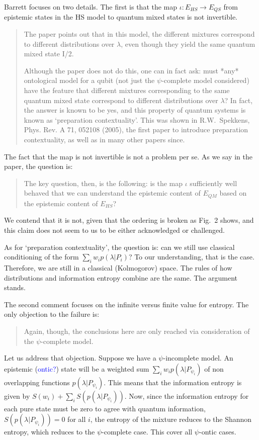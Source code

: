 \documentclass[11pt]{article}
\begin{document}
	Barrett focuses on two details. The first is that the map $\iota : E_{HS} \to E_{QS}$ from epistemic states in the HS model to quantum mixed states is not invertible. 
	\begin{quote}
The paper points out that in this model, the different mixtures correspond to different distributions over $\lambda$, even though they yield the same quantum mixed state I/2.

Although the paper does not do this, one can in fact ask: must *any* ontological model for a qubit (not just the $\psi$-complete model considered) have the feature that different mixtures corresponding to the same quantum mixed state correspond to different distributions over $\lambda$? In fact, the answer is known to be yes, and this property of quantum systems is known as `preparation contextuality’. This was shown in R.W.\ Spekkens, Phys. Rev. A 71, 052108 (2005), the first paper to introduce preparation contextuality, as well as in many other papers since.
	\end{quote}

	The fact that the map is not invertible is not a problem per se. As we say in the paper, the question is:
	\begin{quote}
The key question, then, is the following: is the
map $\iota$ sufficiently well behaved that we can understand
the epistemic content of $E_{QM}$ based on the epistemic
content of $E_{HS}$?
	\end{quote}
We contend that it is not, given that the ordering is broken as Fig.~2 shows, and this claim does not seem to us to be either acknowledged or challenged.

As for `preparation contextuality', the question is: can we still use classical conditioning of the form $\sum_i  w_i p(\lambda| P_i)$? To our understanding, that is the case. Therefore, we are still in a classical (Kolmogorov) space. The rules of how distributions and information entropy combine are the same. The argument stands.

The second comment focuses on the infinite versus finite value for entropy. The only objection to the failure is:
\begin{quote}
Again, though, the conclusions here are only reached via consideration of the $\psi$-complete model.
\end{quote}
Let us address that objection. Suppose we have a $\psi$-incomplete model. An epistemic (\textcolor{blue}{ontic?}) state will be a weighted sum $\sum_i  w_i p(\lambda| P_{\psi_i})$ of non overlapping functions $p(\lambda| P_{\psi_i})$. This means that the information entropy is given by $S(w_i) + \sum_i S(p(\lambda| P_{\psi_i}))$. Now, since the information entropy for each pure state must be zero to agree with quantum information, $S(p(\lambda| P_{\psi_i}))=0$ for all $i$, the entropy of the mixture reduces to the Shannon entropy, which reduces to the $\psi$-complete case. This cover all $\psi$-ontic cases.
\end{document}
